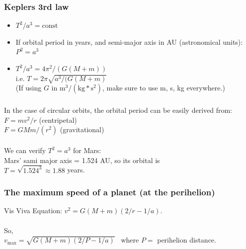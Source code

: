 \documentclass[aspectratio=169,xcolor=pdftex,dvipsnames]{beamer} %
\begin{document}

\begin{frame}
\frametitle{Keplers 3rd law}

\begin{itemize}
\item
    $T^2 / a^3 = \text{const}$
\item
    If orbital period in years, and semi-major axis in AU (astronomical units):\\
    $P^2 = a^3$
\item
    $T^2 / a^3 = 4 \pi^2 / (G(M+m)) $\\
    i.e. $T = 2 \pi \sqrt{a^3 / (G(M+m) }$\\
    (If using $G$ in $\text{m}^3 / (\text{kg} * \text{s}^2)$, make sure to use m, s, kg everywhere.)
\end{itemize}

\end{frame}


\begin{frame}
\frametitle{}

In the case of circular orbits, the orbital period can be easily derived from:\\
$F = mv^2/r$ (centripetal)\\
$F = GMm/(r^2)$ (gravitational)\\
\ \\
We can verify $T^2 = a^3$ for Mars:\\
Mars' sami major axis = 1.524 AU, so its orbital is\\
$T = \sqrt{1.524^3} \approx 1.88$ years.

\end{frame}


\begin{frame}
\frametitle{The maximum speed of a planet (at the perihelion)}

Vis Viva Equation: $v^2 = G(M+m)(2/r - 1/a)$.\\
\ \\
So, \\
$v_{\text{max}} = \sqrt{G(M+m)(2/P - 1/a) }$ \   where $P =$ perihelion distance.

\end{frame}
\end{document}
